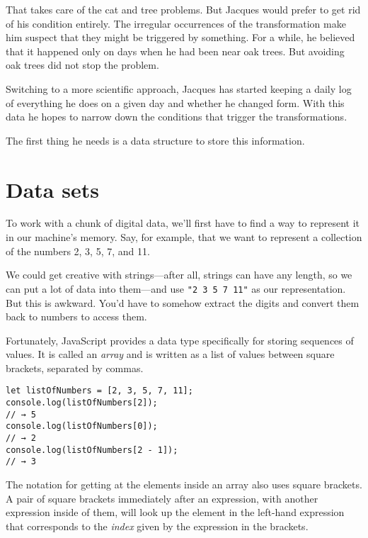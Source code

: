 That takes care of the cat and tree problems. But Jacques would prefer to get rid of his condition entirely. The irregular occurrences of the transformation make him suspect that they might be triggered by something. For a while, he believed that it happened only on days when he had been near oak trees. But avoiding oak trees did not stop the problem.

Switching to a more scientific approach, Jacques has started keeping a daily log of everything he does on a given day and whether he changed form. With this data he hopes to narrow down the conditions that trigger the transformations.

The first thing he needs is a data structure to store this information.

\section{Data sets}

To work with a chunk of digital data, we'll first have to find a way to represent it in our machine's memory. Say, for example, that we want to represent a collection of the numbers 2, 3, 5, 7, and 11.

We could get creative with strings—after all, strings can have any length, so we can put a lot of data into them—and use \lstinline`"2 3 5 7 11"` as our representation. But this is awkward. You'd have to somehow extract the digits and convert them back to numbers to access them.

Fortunately, JavaScript provides a data type specifically for storing sequences of values. It is called an \emph{array} and is written as a list of values between square brackets, separated by commas.

\begin{lstlisting}
let listOfNumbers = [2, 3, 5, 7, 11];
console.log(listOfNumbers[2]);
// → 5
console.log(listOfNumbers[0]);
// → 2
console.log(listOfNumbers[2 - 1]);
// → 3
\end{lstlisting}
\noindent{}

The notation for getting at the elements inside an array also uses square brackets. A pair of square brackets immediately after an expression, with another expression inside of them, will look up the element in the left-hand expression that corresponds to the \emph{index} given by the expression in the brackets.


